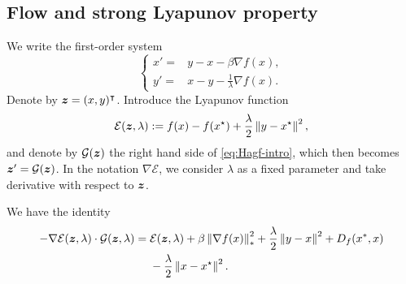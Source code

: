 \documentclass[10pt]{amsart}
\begin{document}
\subsection{Flow and strong Lyapunov property}
We write the first-order system
\begin{equation}\label{eq:Hagf-intro}
	\left\{
	\begin{aligned}
		x' = {}&y-x-\beta\nabla f(x),\\
		y'={}&x - y -\frac{1}{\lambda}\nabla f(x).
	\end{aligned}
	\right.
\end{equation}
Denote by $\boldsymbol z=(x, y)^{\intercal}$. Introduce the Lyapunov function
$$
\mathcal E(\boldsymbol z, \lambda):=f(x)-f(x^{\star})+\frac{\lambda}{2}\left\lVert {y-x^{\star}} \right\rVert^2,
$$
and denote by $\mathcal G(\boldsymbol z)$ the right hand side of \eqref{eq:Hagf-intro},
which then becomes $\boldsymbol z' = \mathcal G(\boldsymbol z)$. In the notation $\nabla \mathcal E$, we consider $\lambda$ as a fixed parameter and take derivative with respect to $\boldsymbol z$. 
\begin{lemma}We have the identity
 \begin{equation}
 \begin{aligned}
	-\nabla \mathcal E(\boldsymbol z, \lambda) \cdot \mathcal G(\boldsymbol z, \lambda) = {}&
\mathcal E(\boldsymbol z, \lambda)+ \beta \left\lVert {\nabla f(x)} \right\rVert_*^2  +\frac{\lambda}{2}\left\lVert {y-x} \right\rVert^2 +  D_f(x^*, x) \\
&-\frac{\lambda}{2}\left\lVert {x - x^{\star}} \right\rVert^2.	
\end{aligned}
\end{equation}
\end{lemma}
\end{document}
